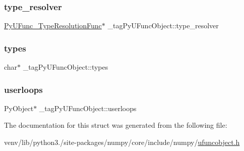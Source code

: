 \subsubsection{\texorpdfstring{type\+\_\+resolver}{type\_resolver}}
{\footnotesize\ttfamily \hyperlink{ufuncobject_8h_a20dc8cfe5d10458c985f2e9130be635a}{Py\+U\+Func\+\_\+\+Type\+Resolution\+Func}$\ast$ \+\_\+tag\+Py\+U\+Func\+Object\+::type\+\_\+resolver}

\mbox{\label{struct__tagPyUFuncObject_ae36720bb42508d9a997a1681081fedae}} 
\subsubsection{\texorpdfstring{types}{types}}
{\footnotesize\ttfamily char$\ast$ \+\_\+tag\+Py\+U\+Func\+Object\+::types}

\mbox{\label{struct__tagPyUFuncObject_ac06355984ac7a4c881ea7b9ba9455e89}} 
\subsubsection{\texorpdfstring{userloops}{userloops}}
{\footnotesize\ttfamily Py\+Object$\ast$ \+\_\+tag\+Py\+U\+Func\+Object\+::userloops}



The documentation for this struct was generated from the following file\+:\begin{DoxyCompactItemize}
\item 
venv/lib/python3./site-\/packages/numpy/core/include/numpy/\hyperlink{ufuncobject_8h}{ufuncobject.\+h}\end{DoxyCompactItemize}
